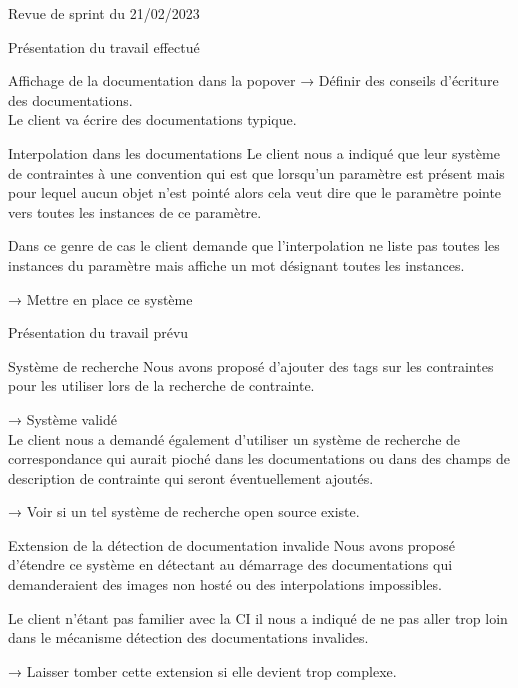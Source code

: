 \documentclass[]{article}
\begin{document}
{\begin{section}{Revue de sprint du 21/02/2023}
\begin{subsection}{Présentation du travail effectué}
\begin{subsubsection}{Affichage de la documentation dans la popover}
         → Définir des conseils d’écriture des documentations.
         \\[5mm]
         Le client va écrire des documentations typique.
     \end{subsubsection}

     \newpage

     \begin{subsubsection}{Interpolation dans les documentations}
         Le client nous a indiqué que leur système de contraintes à une convention qui est que lorsqu’un paramètre est présent mais pour lequel aucun objet n’est pointé alors cela veut dire que le paramètre pointe vers toutes les instances de ce paramètre.

         Dans ce genre de cas le client demande que l’interpolation ne liste pas toutes les instances du paramètre mais affiche un mot désignant toutes les instances.

         → Mettre en place ce système
     \end{subsubsection}
 \end{subsection}

 \begin{subsection}{Présentation du travail prévu}
     \begin{subsubsection}{Système de recherche}
         Nous avons proposé d’ajouter des tags sur les contraintes pour les utiliser lors de la recherche de contrainte.

         → Système validé
         \\[5mm]
         Le client nous a demandé également d’utiliser un système de recherche de correspondance qui aurait pioché dans les documentations ou dans des champs de description de contrainte qui seront éventuellement ajoutés.

         → Voir si un tel système de recherche open source existe.
     \end{subsubsection}

     \begin{subsubsection}{Extension de la détection de documentation invalide}
         Nous avons proposé d’étendre ce système en détectant au démarrage des documentations qui demanderaient des images non hosté ou des interpolations impossibles.

         Le client n’étant pas familier avec la CI il nous a indiqué de ne pas aller trop loin dans le mécanisme détection des documentations invalides.

         → Laisser tomber cette extension si elle devient trop complexe.
     \end{subsubsection}
 \end{subsection}


\end{section}}
\end{document}
